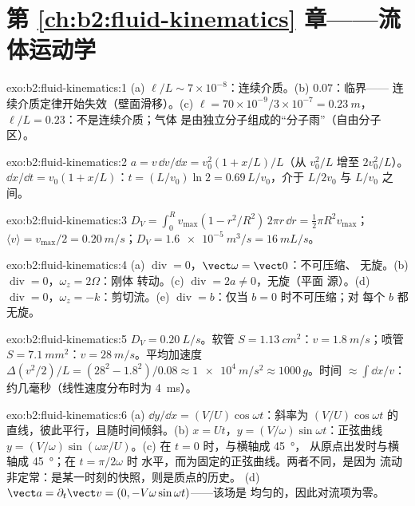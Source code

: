 \section*{第 \ref{ch:b2:fluid-kinematics} 章——流体运动学}

\begin{solution}{exo:b2:fluid-kinematics:1}
(a) $\ell/L \sim 7 \times 10^{-8}$：连续介质。(b) $0.07$：临界——
连续介质定律开始失效（壁面滑移）。(c) $\ell = 70 \times 10^{-9}
/3 \times 10^{-7} = \qty{0.23}{m}$，$\ell/L = 0.23$：不是连续介质；气体
是由独立分子组成的“分子雨”（自由分子区）。
\end{solution}

\begin{solution}{exo:b2:fluid-kinematics:2}
$a = v\,\dd v/\dd x = v_0^2(1 + x/L)/L$（从 $v_0^2/L$ 增至 $2v_0^2/L$）。
$\dd x/\dd t = v_0(1 + x/L)$：$t = (L/v_0)\ln2 = 0.69\,L/v_0$，介于
$L/2v_0$ 与 $L/v_0$ 之间。
\end{solution}

\begin{solution}{exo:b2:fluid-kinematics:3}
$D_V = \int_0^Rv_{\max}(1 - r^2/R^2)\,2\pi r\,\dd r = \tfrac12\pi R^2v_{\max}$；
$\langle v\rangle = v_{\max}/2 = \qty{0.20}{m/s}$；$D_V = \qty{1.6e-5}{m^3/s} =
\qty{16}{mL/s}$。
\end{solution}

\begin{solution}{exo:b2:fluid-kinematics:4}
(a) $\operatorname{div} = 0$，$\vect\omega = \vect 0$：不可压缩、
无旋。(b) $\operatorname{div} = 0$，$\omega_z = 2\Omega$：刚体
转动。(c) $\operatorname{div} = 2a \ne 0$，无旋（平面
源）。(d) $\operatorname{div} = 0$，$\omega_z = -k$：剪切流。(e)
$\operatorname{div} = b$：仅当 $b = 0$ 时不可压缩；对
每个 $b$ 都无旋。
\end{solution}

\begin{solution}{exo:b2:fluid-kinematics:5}
$D_V = \qty{0.20}{L/s}$。软管 $S = \qty{1.13}{cm^2}$：$v = \qty{1.8}{m/s}$；喷管
$S = \qty{7.1}{mm^2}$：$v = \qty{28}{m/s}$。平均加速度 $\Delta(v^2/2)/L
= (28^2 - 1.8^2)/0.08 \approx \qty{1e4}{m/s^2} \approx 1000\,g$。时间 $\approx
\int\dd x/v$：约几毫秒（线性速度分布时为 \qty{4}{ms}）。
\end{solution}

\begin{solution}{exo:b2:fluid-kinematics:6}
(a) $\dd y/\dd x = (V/U)\cos\omega t$：斜率为
$(V/U)\cos\omega t$ 的直线，彼此平行，且随时间倾斜。(b) $x = Ut$，$y =
(V/\omega)\sin\omega t$：正弦曲线 $y = (V/\omega)\sin(\omega x/U)$。(c) 在
$t = 0$ 时，与横轴成 \qty{45}{\degree}，
从原点出发时与横轴成 \qty{45}{\degree}；在 $t = \pi/2\omega$ 时
水平，而为固定的正弦曲线。两者不同，是因为
流动非定常：是某一时刻的快照，则是质点的历史。
(d) $\vect a = \partial_t\vect v = (0, -V\omega\sin\omega t)$——该场是
均匀的，因此对流项为零。
\end{solution}

